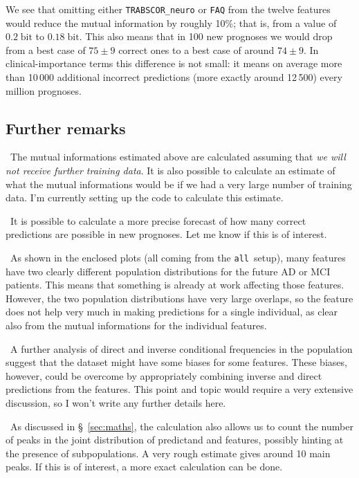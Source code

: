 \documentclass[\ifafour a4paper,12pt,\else a5paper,10pt,\fi%
onecolumn,oneside,article,%
british%
]{memoir}
\theoremstyle{remark}
\theoremstyle{innote}
\renewcommand*{\|}[1][]{\nonscript\:#1\vert\nonscript\:\mathopen{}}
\newcommand*{\sect}{\S}%
\newcommand*{\bit}{\textrm{bit}}
\newcommand*{\all}{\texttt{all}}
\begin{document}
We see that omitting either \texttt{TRABSCOR\_neuro} or \texttt{FAQ} from
the twelve features would reduce the mutual information by roughly 10\%;
that is, from a value of $0.2\;\bit$ to $0.18\;\bit$. This also means that
in 100 new prognoses we would drop from a best case of $75\pm 9$ correct
ones to a best case of around $74\pm 9$. In clinical-importance terms this
difference is not small: it means on average more than 10\,000 additional
incorrect predictions (more exactly around 12\,500) every million
prognoses.

\subsection{Further remarks}
\label{sec:remarks}

\textbullet\ The mutual informations estimated above are calculated
assuming that \emph{we will not receive further training data}. It is also
possible to calculate an estimate of what the mutual informations would be
if we had a very large number of training data. I'm currently setting up
the code to calculate this estimate.

\medskip

\noindent\textbullet\ It is possible to calculate a more precise forecast
of how many correct predictions are possible in new prognoses. Let me know
if this is of interest.

\medskip

\noindent\textbullet\ As shown in the enclosed plots (all coming from the \all\ setup), many
features have two clearly different population distributions for the future
AD or MCI patients. This means that something is already at work affecting
those features. However, the two population distributions have very large
overlaps, so the feature does not help very much in making predictions for
a single individual, as clear also from the mutual informations for the
individual features.

\medskip

\noindent\textbullet\ A further analysis of direct and inverse conditional
frequencies in the population suggest that the dataset might have some
biases for some features. These biases, however, could be overcome by
appropriately combining inverse and direct predictions from the features.
This point and topic would require a very extensive discussion, so I won't
write any further details here.

\medskip

\noindent\textbullet\ As discussed in \sect~\ref{sec:maths}, the calculation also allows us to
count the number of peaks in the joint distribution of predictand and
features, possibly hinting at the presence of subpopulations. A very rough
estimate gives around 10 main peaks. If this is of interest, a more exact
calculation can be done.
\end{document}
